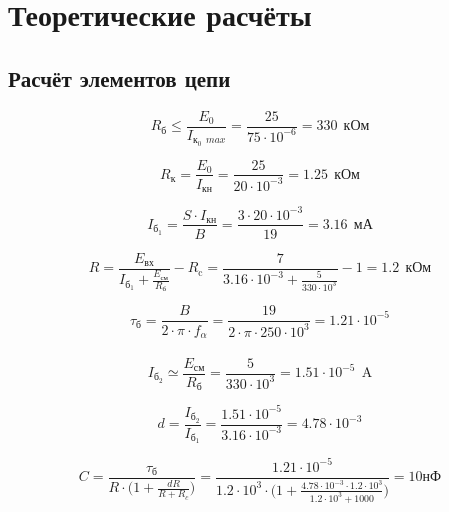 \section{Теоретические расчёты}

\subsection{Расчёт элементов цепи}

\begin{displaymath}
R_\text{б} \leq \frac{E_0}{I_{\text{к}_0\ \ max}} = \frac{25}{75 \cdot 10^{-6}} = 330\ \ \text{кОм}
\end{displaymath}

\begin{displaymath}
R_\text{к} = \frac{E_0}{I_\text{кн}} = \frac{25}{20 \cdot 10^{-3}} = 1.25\ \ \text{кОм}
\end{displaymath}

\begin{displaymath}
I_{\text{б}_1} = \frac{S \cdot I_\text{кн}}{B} = \frac{3 \cdot 20 \cdot 10^{-3}}{19} = 3.16\ \ \text{мА}
\end{displaymath}

\begin{displaymath}
R = \frac{E_\text{вх}}{I_{\text{б}_1} + \frac{E_\text{см}}{R_\text{б}}} - R_\text{c} = \frac{7}{3.16 \cdot 10^{-3} + \frac{5}{330 \cdot 10^3}} - 1 = 1.2\ \ \text{кОм}
\end{displaymath}

\begin{displaymath}
\tau_{\text{б}} = \frac{B}{2 \cdot \pi \cdot f_\alpha} = \frac{19}{2 \cdot \pi \cdot 250 \cdot 10^3} = 1.21 \cdot 10^{-5}
\end{displaymath}\\[1cm]

\begin{displaymath}
I_{\text{б}_2} \simeq \frac{E_\text{см}}{R_\text{б}} = \frac{5}{330 \cdot 10^3} = 1.51 \cdot 10^{-5}\ \ \text{A}
\end{displaymath}

\begin{displaymath}
d = \frac{I_{\text{б}_2}}{I_{\text{б}_1}} = \frac{ 1.51 \cdot 10^{-5}}{3.16 \cdot 10^{-3}} = 4.78 \cdot 10^{-3}
\end{displaymath}

\begin{displaymath}
C = \frac{\tau_{\text{б}}}{R \cdot \Big ( 1 + \frac{dR}{R+R_c} \Big )} = \frac{1.21 \cdot 10^{-5}}{1.2 \cdot 10^3 \cdot \Big ( 1 + \frac{4.78 \cdot 10^{-3} \cdot 1.2 \cdot 10^3}{1.2 \cdot 10^3+1000} \Big )} = 10 \text{нФ}
\end{displaymath}

